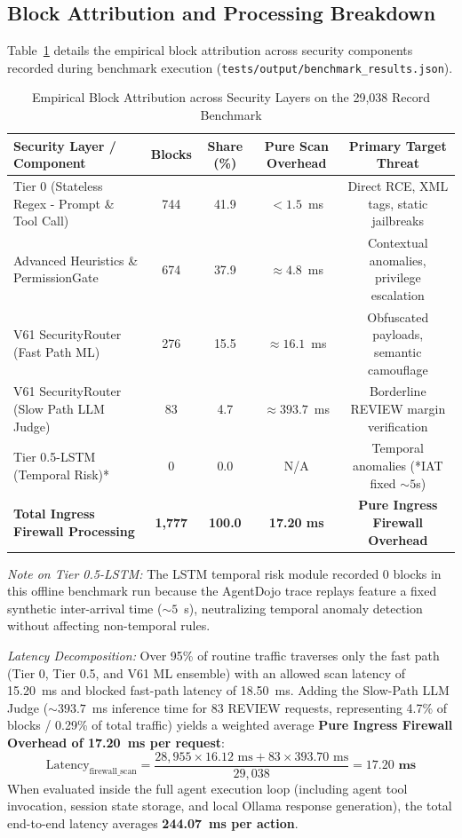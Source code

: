 \documentclass[conference]{IEEEtran}
\begin{document}
\subsection{Block Attribution and Processing Breakdown}
Table~\ref{tab:block_attribution} details the empirical block attribution across security components recorded during benchmark execution (\texttt{tests/output/benchmark\_results.json}).

\begin{table}[htbp]
\caption{Empirical Block Attribution across Security Layers on the 29,038 Record Benchmark}
\label{tab:block_attribution}
\centering
\begin{tabular}{lcccc}
\toprule
\textbf{Security Layer / Component} & \textbf{Blocks} & \textbf{Share (\%)} & \textbf{Pure Scan Overhead} & \textbf{Primary Target Threat} \\
\midrule
Tier 0 (Stateless Regex - Prompt \& Tool Call) & 744 & 41.9 & $< 1.5$~ms & Direct RCE, XML tags, static jailbreaks \\
Advanced Heuristics \& PermissionGate & 674 & 37.9 & $\approx 4.8$~ms & Contextual anomalies, privilege escalation \\
V61 SecurityRouter (Fast Path ML) & 276 & 15.5 & $\approx 16.1$~ms & Obfuscated payloads, semantic camouflage \\
V61 SecurityRouter (Slow Path LLM Judge) & 83 & 4.7 & $\approx 393.7$~ms & Borderline REVIEW margin verification \\
Tier 0.5-LSTM (Temporal Risk)* & 0 & 0.0 & N/A & Temporal anomalies (*IAT fixed $\sim 5$s) \\
\midrule
\textbf{Total Ingress Firewall Processing} & \textbf{1,777} & \textbf{100.0} & \textbf{17.20 ms} & \textbf{Pure Ingress Firewall Overhead} \\
\bottomrule
\end{tabular}
\end{table}

\textit{Note on Tier 0.5-LSTM:} The LSTM temporal risk module recorded 0 blocks in this offline benchmark run because the AgentDojo trace replays feature a fixed synthetic inter-arrival time ($\sim 5$~s), neutralizing temporal anomaly detection without affecting non-temporal rules.

\textit{Latency Decomposition:} Over 95\% of routine traffic traverses only the fast path (Tier 0, Tier 0.5, and V61 ML ensemble) with an allowed scan latency of 15.20~ms and blocked fast-path latency of 18.50~ms. Adding the Slow-Path LLM Judge ($\sim 393.7$~ms inference time for 83 REVIEW requests, representing 4.7\% of blocks / 0.29\% of total traffic) yields a weighted average \textbf{Pure Ingress Firewall Overhead of 17.20~ms per request}:
\begin{equation}
\text{Latency}_{\text{firewall\_scan}} = \frac{28,955 \times 16.12\text{ ms} + 83 \times 393.70\text{ ms}}{29,038} = \mathbf{17.20\text{ ms}}
\end{equation}
When evaluated inside the full agent execution loop (including agent tool invocation, session state storage, and local Ollama response generation), the total end-to-end latency averages \textbf{244.07~ms per action}.
\end{document}
